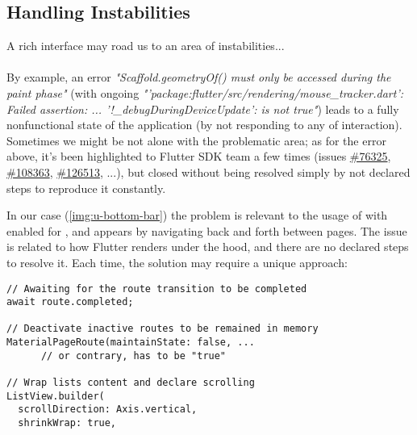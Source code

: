 
\subsection{Handling Instabilities}

A rich interface may road us to an area of instabilities...\\
\\

\noindent By example, an error \emph{"Scaffold.geometryOf() must only be accessed during the paint phase"} (with ongoing 
\emph{"'package:flutter/src/rendering/mouse\_tracker.dart': Failed assertion: ... '!\_debugDuringDeviceUpdate': 
is not true"}) leads to a fully nonfunctional state  of the application (by not responding to any of interaction).
Sometimes we might be not alone with the problematic area; as for the error above, it's been highlighted to Flutter 
SDK team a few times (issues \href{https://github.com/flutter/flutter/issues/76325}{\#76325},
\href{https://github.com/flutter/flutter/issues/108363}{\#108363}, 
\href{https://github.com/flutter/flutter/issues/126513}{\#126513}, ...), but closed without being resolved simply by 
not declared steps to reproduce it constantly.


\noindent In our case (\cref{img:u-bottom-bar}) the problem is relevant to the usage of 
 with enabled  for , and appears by 
navigating back and forth between pages. The issue is related to how Flutter renders under the hood, and there are no 
declared steps to resolve it. Each time, the solution may require a unique approach:

\begin{lstlisting}
// Awaiting for the route transition to be completed
await route.completed;

// Deactivate inactive routes to be remained in memory
MaterialPageRoute(maintainState: false, ... 
      // or contrary, has to be "true"

// Wrap lists content and declare scrolling
ListView.builder(
  scrollDirection: Axis.vertical,
  shrinkWrap: true,
\end{lstlisting}

